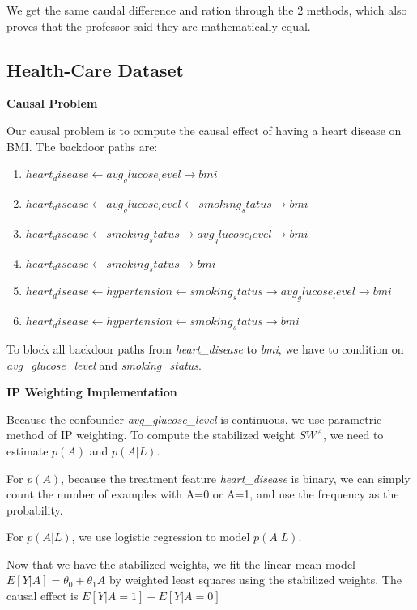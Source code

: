 \documentclass[letterpaper,12pt]{article}
\begin{document}
We get the same caudal difference and ration through the 2 methods, which also proves that the professor said they are mathematically equal.

\subsection{Health-Care Dataset}
\textbf{Causal Problem}\par

Our causal problem is to compute the causal effect of having a heart disease on BMI. The backdoor paths are:

\begin{enumerate}
\item $heart_disease \leftarrow avg_glucose_level \rightarrow bmi $
\item $heart_disease \leftarrow avg_glucose_level \leftarrow smoking_status \rightarrow bmi $ 
\item $heart_disease \leftarrow smoking_status \rightarrow avg_glucose_level \rightarrow bmi $
\item $heart_disease \leftarrow smoking_status \rightarrow bmi $
\item $heart_disease \leftarrow hypertension \leftarrow smoking_status \rightarrow avg_glucose_level \rightarrow bmi $
\item $heart_disease \leftarrow hypertension \leftarrow smoking_status \rightarrow bmi $
\end{enumerate}

To block all backdoor paths from \emph{heart_disease} to \emph{bmi}, we have to condition on \emph{avg_glucose_level} and \emph{smoking_status}.

\textbf{IP Weighting Implementation}\par

Because the confounder \emph{avg_glucose_level} is continuous, we use parametric method of IP weighting. To compute the stabilized weight $SW^{A}$, we need to estimate $p(A)$ and $p(A|L)$.

For $p(A)$, because the treatment feature \emph{heart_disease} is binary, we can simply count the number of examples with A=0 or A=1, and use the frequency as the probability.

For $p(A|L)$, we use logistic regression to model $p(A|L)$.

Now that we have the stabilized weights, we fit the linear mean model $E[Y|A]=\theta_{0}+\theta_{1}A$ by weighted least squares using the stabilized weights. The causal effect is $E[Y|A=1]-E[Y|A=0]$
\end{document}
